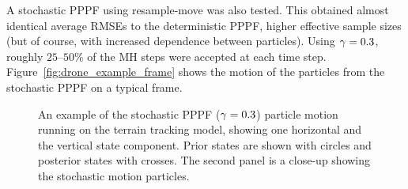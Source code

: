 \documentclass{article}
\begin{document}
A stochastic PPPF using resample-move was also tested. This obtained almost identical average RMSEs to the deterministic PPPF, higher effective sample sizes (but of course, with increased dependence between particles). Using $\gamma=0.3$, roughly $25$--$50\%$ of the MH steps were accepted at each time step. Figure~\ref{fig:drone_example_frame} shows the motion of the particles from the stochastic PPPF on a typical frame.
%
\begin{figure}
\centering
{}
\caption{An example of the stochastic PPPF ($\gamma=0.3$) particle motion running on the terrain tracking model, showing one horizontal and the vertical state component. Prior states are shown with circles and posterior states with crosses. The second panel is a close-up showing the stochastic motion particles.}
\label{fig:drone_example_frame_stochastic}
\end{figure}
\end{document}
